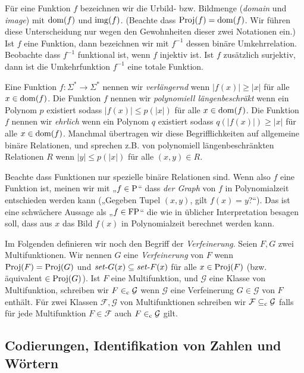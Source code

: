 Für eine Funktion $f$ bezeichnen wir die Urbild- bzw. Bildmenge (\emph{domain} und \emph{image}) mit $\dom(f)$ und $\img(f)$. (Beachte dass $\Proj(f)=\dom(f)$. Wir führen diese Unterscheidung nur wegen den Gewohnheiten dieser zwei Notationen ein.) Ist $f$ eine Funktion, dann bezeichnen wir mit $f^{-1}$ dessen binäre Umkehrrelation. Beobachte dass $f^{-1}$ funktional ist, wenn $f$ injektiv ist. Ist $f$ zusätzlich surjektiv, dann ist die Umkehrfunktion $f^{-1}$ eine totale Funktion.

Eine Funktion $f\colon\Sigma^*\to\Sigma^*$ nennen wir \emph{verlängernd} wenn $|f(x)|\geq |x|$ für alle $x\in\dom(f)$.
Die Funktion $f$ nennen wir \emph{polynomiell längenbeschräkt} wenn ein Polynom $p$ existiert sodass $|f(x)|\leq p(|x|)$ für alle $x\in\dom(f)$.
Die Funktion $f$ nennen wir \emph{ehrlich} wenn ein Polynom $q$ existiert sodass $q(|f(x)|)\geq |x|$ für alle $x\in\dom(f)$.
Manchmal übertragen wir diese Begrifflichkeiten auf allgemeine binäre Relationen, und sprechen z.B. von polynomiell längenbeschränkten Relationen $R$ wenn $|y|\leq p(|x|)$ für alle $(x,y)\in R$.

Beachte dass Funktionen nur spezielle binäre Relationen sind. Wenn also $f$ eine Funktion ist, meinen wir mit „$f\in\P$“ dass \emph{der Graph} von $f$ in Polynomialzeit entschieden werden kann („Gegeben Tupel $(x, y)$, gilt $f(x)=y$?“). Das ist eine schwächere Aussage als „$f\in\FP$“ die wie in üblicher Interpretation besagen soll, dass aus $x$ das Bild $f(x)$ in Polynomialzeit berechnet werden kann.

Im Folgenden definieren wir noch den Begriff der \emph{Verfeinerung}. Seien $F, G$ zwei Multifunktionen. Wir nennen $G$ eine \emph{Verfeinerung} von $F$ wenn $\Proj(F)=\Proj(G)$ und $\fset{}G(x)\subseteq \fset{}F(x)$ für alle $x\in\Proj(F)$ (bzw. äquivalent $\in \Proj(G)$).
Ist $F$ eine Multifunktion, und $\mathcal G$ eine Klasse von Multifunktion, schreiben wir $F\inc \mathcal G$ wenn $\mathcal G$ eine Verfeinerung $G\in\mathcal G$ von $F$ enthält.
Für zwei Klassen $\mathcal F, \mathcal G$ von Multifunktionen schreiben wir $\mathcal F \subseteqc \mathcal G$ falls für jede Multifunktion $F\in\mathcal F$ auch $F\inc \mathcal G$ gilt.

\subsection*{Codierungen, Identifikation von Zahlen und Wörtern}

